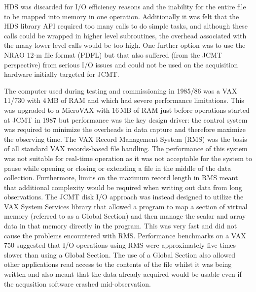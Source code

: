 \documentclass[final,authoryear,5p,times,twocolumn]{elsarticle}
\begin{document}
HDS was discarded for I/O efficiency reasons and the inability for the
entire file to be mapped into memory in one operation. Additionally it
was felt that the HDS library API required too many calls to do simple
tasks, and although these calls could be wrapped in higher level
subroutines, the overhead associated with the many lower level calls
would be too high. One further option was to use the NRAO 12-m file format (PDFL)
but that also suffered
(from the JCMT perspective) from serious I/O issues and could not be used
on the acquisition hardware initially targeted for JCMT.

The computer used during testing and commissioning in 1985/86 was a
VAX 11/730 with 4\,MB of RAM and which had severe performance
limitations. This was upgraded to a MicroVAX with 16\,MB of RAM just
before operations started at JCMT in 1987 but performance was the key
design driver: the control system was required to minimize the
overheads in data capture and therefore maximize the observing
time. The VAX Record Management System (RMS) was the basis of
all standard VAX records-based file handling. The performance of
this system was not suitable for real-time operation
as it was not acceptable for the system to pause while
opening or closing or extending a file in the middle of the data
collection. Furthermore, limits on the maximum record length in RMS
meant that additional complexity would be required when writing out
data from long observations. The JCMT disk I/O approach was instead
designed to utilize the VAX System Services library that allowed a
program to map a section of virtual memory
(referred to as a Global Section) and then manage the scalar
and array data in that memory directly in the program. This was very
fast and did not cause the problems encountered with RMS. Performance
benchmarks on a VAX 750 \citep{mtin33} suggested that I/O operations
using RMS were approximately five times slower than using a Global
Section. The use of a Global Section also allowed other applications
read access to the contents of the file whilst it was being
written and also meant that the data already acquired would be usable
even if the acqusition software crashed mid-observation.
\end{document}
